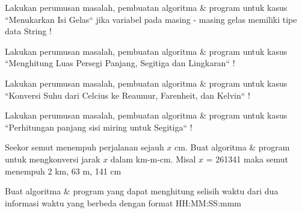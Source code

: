 \begin{pemrograman}
Lakukan perumusan masalah, pembuatan algoritma \& program untuk kasus ``Menukarkan Isi Gelas`` jika variabel pada masing - masing gelas memiliki tipe data String !
\end{pemrograman}

\begin{pemrograman}
Lakukan perumusan masalah, pembuatan algoritma \& program untuk kasus ``Menghitung Luas Persegi Panjang, Segitiga dan Lingkaran`` !
\end{pemrograman}

\begin{pemrograman}
Lakukan perumusan masalah, pembuatan algoritma \& program untuk kasus ``Konversi Suhu dari Celcius ke Reaumur, Farenheit, dan Kelvin`` !
\end{pemrograman}

\begin{pemrograman}
Lakukan perumusan masalah, pembuatan algoritma \& program untuk kasus ``Perhitungan panjang sisi miring untuk Segitiga`` !
\end{pemrograman}

\begin{pemrograman}
Seekor semut menempuh perjalanan sejauh $x$ cm. Buat algoritma \& program untuk mengkonversi jarak $x$ dalam km-m-cm. Misal $x$ = 261341
maka semut menempuh 2 km, 63 m, 141 cm
\end{pemrograman}

\begin{pemrograman}
Buat algoritma \& program yang dapat menghitung selisih waktu dari dua informasi waktu yang berbeda dengan format HH:MM:SS:mmm
\end{pemrograman}



